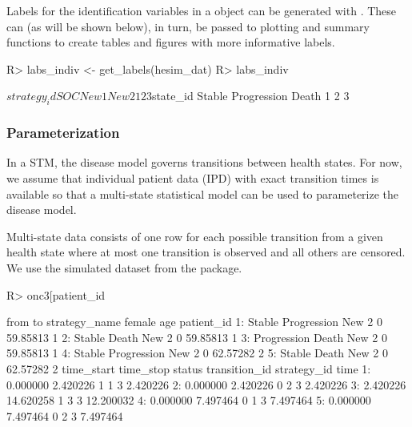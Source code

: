 \documentclass[article, nojss]{jss}\usepackage[]{graphicx}\usepackage[]{color}
\begin{document}
Labels for the identification variables in a  object can be generated with . These can (as will be shown below), in turn, be passed to plotting and summary functions to create tables and figures with more informative labels. 

\begin{Schunk}
\begin{Sinput}
R> labs_indiv <- get_labels(hesim_dat)
R> labs_indiv
\end{Sinput}
\begin{Soutput}
$strategy_id
  SOC New 1 New 2 
    1     2     3 

$state_id
     Stable Progression       Death 
          1           2           3 
\end{Soutput}
\end{Schunk}


\subsubsection{Parameterization}
In a STM, the disease model governs transitions between health states. For now, we assume that individual patient data (IPD) with exact transition times is available so that a multi-state statistical model can be used to parameterize the disease model. 

Multi-state data consists of one row for each possible transition from a given health state where at most one transition is observed and all others are censored. We use the simulated dataset  from the  package.

\begin{Schunk}
\begin{Sinput}
R> onc3[patient_id %
\end{Sinput}
\begin{Soutput}
          from          to strategy_name female      age patient_id
1:      Stable Progression         New 2      0 59.85813          1
2:      Stable       Death         New 2      0 59.85813          1
3: Progression       Death         New 2      0 59.85813          1
4:      Stable Progression         New 2      0 62.57282          2
5:      Stable       Death         New 2      0 62.57282          2
   time_start time_stop status transition_id strategy_id      time
1:   0.000000  2.420226      1             1           3  2.420226
2:   0.000000  2.420226      0             2           3  2.420226
3:   2.420226 14.620258      1             3           3 12.200032
4:   0.000000  7.497464      0             1           3  7.497464
5:   0.000000  7.497464      0             2           3  7.497464
\end{Soutput}
\end{Schunk}
\end{document}
